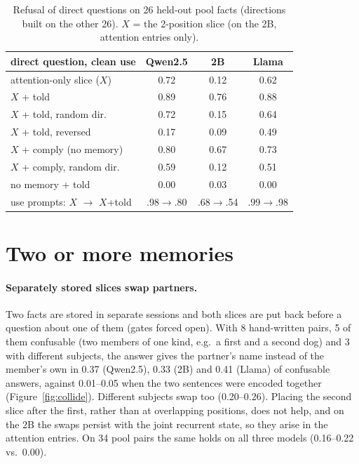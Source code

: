 \documentclass[11pt]{article}
\begin{document}
\begin{table}[t]
\centering\small
\setlength{\tabcolsep}{4pt}
\begin{tabular}{@{}lccc@{}}
\toprule
direct question, clean use & Qwen2.5 & 2B & Llama \\
\midrule
attention-only slice ($X$) & 0.72 & 0.12 & 0.62 \\
$X$ + told & 0.89 & 0.76 & 0.88 \\
$X$ + told, random dir. & 0.72 & 0.15 & 0.64 \\
$X$ + told, reversed & 0.17 & 0.09 & 0.49 \\
$X$ + comply (no memory) & 0.80 & 0.67 & 0.73 \\
$X$ + comply, random dir. & 0.59 & 0.12 & 0.51 \\
no memory + told & 0.00 & 0.03 & 0.00 \\
\midrule
use prompts: $X$ $\to$ $X$+told & .98$\to$.80 & .68$\to$.54 & .99$\to$.98 \\
\bottomrule
\end{tabular}
\caption{Refusal of direct questions on 26 held-out pool facts (directions built on the other 26). $X$ = the
2-position slice (on the 2B, attention entries only).}
\label{tab:refusal}
\end{table}

\section{Two or more memories}
\label{sec:two}

\paragraph{Separately stored slices swap partners.} Two facts are stored in separate sessions and both slices are put
back before a question about one of them (gates forced open). With 8 hand-written pairs, 5 of them confusable (two
members of one kind, e.g.\ a first and a second dog) and 3 with different subjects, the answer gives the partner's
name instead of the member's own in 0.37 (Qwen2.5), 0.33 (2B) and 0.41 (Llama) of confusable answers, against 0.01--0.05
when the two sentences were encoded together (Figure~\ref{fig:collide}). Different subjects swap too (0.20--0.26).
Placing the second slice after the first, rather than at overlapping positions, does not help, and on the 2B the
swaps persist with the joint recurrent state, so they arise in the attention entries. On 34 pool pairs the same holds
on all three models (0.16--0.22 vs.\ 0.00).
\end{document}
